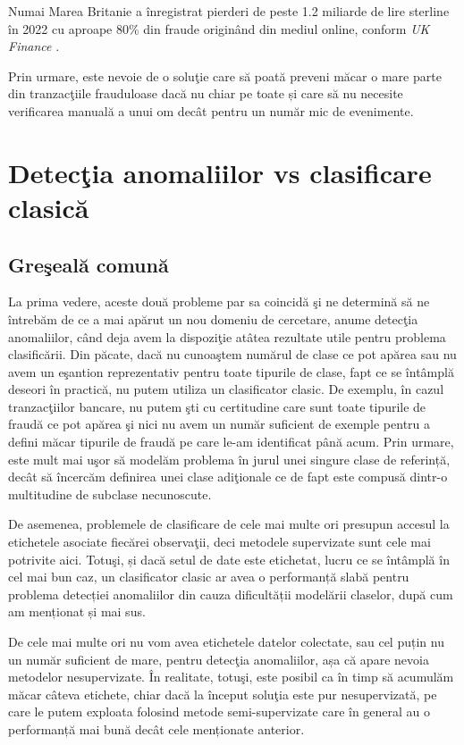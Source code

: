 Numai Marea Britanie a înregistrat pierderi de peste 1.2 
miliarde de lire sterline în 2022 cu aproape 80\% din fraude
originând din mediul online, conform \textit{UK Finance}
\cite{uk-finance}.

Prin urmare, este nevoie de o soluţie care să poată 
preveni măcar o mare parte din tranzacţiile frauduloase dacă
nu chiar pe toate și care să nu necesite verificarea manuală
a unui om decât pentru un număr mic de evenimente.


\section{Detecţia anomaliilor vs clasificare clasică}

\subsection{Greşeală comună}

La prima vedere, aceste două probleme par sa coincidă şi ne determină
să ne întrebăm de ce a mai apărut un nou domeniu de cercetare, anume detecţia
anomaliilor, când deja avem la dispoziţie atâtea rezultate utile pentru 
problema clasificării. Din păcate, dacă nu cunoaştem numărul de clase ce pot apărea 
sau nu avem un eşantion reprezentativ pentru toate tipurile de clase, fapt ce se 
întâmplă deseori în practică, nu putem utiliza un clasificator clasic. De exemplu, 
în cazul tranzacţiilor bancare, nu putem şti cu certitudine care sunt toate 
tipurile de fraudă ce pot apărea şi nici nu avem un număr suficient de exemple 
pentru a defini măcar tipurile de fraudă pe care le-am identificat până acum.
Prin urmare, este mult mai uşor să modelăm problema în jurul unei singure clase 
de referință, decât să încercăm definirea unei clase adiţionale ce de fapt 
este compusă dintr-o multitudine de subclase necunoscute.

De asemenea, problemele de clasificare de cele mai multe ori presupun 
accesul la etichetele asociate fiecărei observaţii, deci metodele 
supervizate sunt cele mai potrivite aici. Totuşi, și dacă setul de date 
este etichetat, lucru ce se întâmplă în cel mai bun caz, un clasificator 
clasic ar avea o performanță slabă pentru problema detecției anomaliilor
din cauza dificultății modelării claselor, după cum am menționat și mai sus.

De cele mai multe ori nu vom avea etichetele datelor colectate, sau 
cel puțin nu un număr suficient de mare, 
pentru detecţia anomaliilor, așa că apare nevoia metodelor nesupervizate. 
În realitate, totuşi, este posibil ca în timp să acumulăm măcar câteva etichete, chiar 
dacă la început soluţia este pur nesupervizată, pe care le putem 
exploata folosind metode semi-supervizate care în general au o performanță 
mai bună decât cele menționate anterior.

